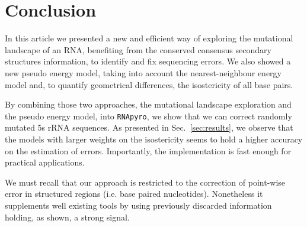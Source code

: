 \section{Conclusion}
\label{sec:conclusion}

In this article we presented a new and efficient way of
exploring the mutational landscape of an RNA, benefiting from the
 conserved consensus secondary structures  information,
to identify and fix sequencing errors. We also showed a new
 pseudo energy model, taking into account the nearest-neighbour energy model 
and, to quantify geometrical differences,  the isostericity of all base pairs. 

By combining those two approaches,  the 
mutational landscape exploration and the pseudo energy model,
 into \texttt{RNApyro}, we show that we can
correct randomly mutated 5s rRNA sequences. 
As presented in Sec.~\ref{sec:results},
we observe that the models
with larger weights on the
isostericity seems to hold a higher accuracy on the estimation of errors.
Importantly, the implementation is fast enough for practical applications.

We must recall that our approach is restricted to
 the correction of point-wise error in structured regions (i.e. base paired nucleotides).
 Nonetheless it supplements well existing tools by using previously discarded
information holding, as shown, a strong signal.

